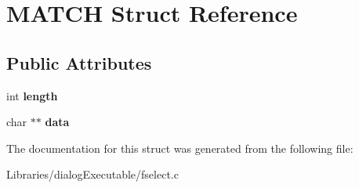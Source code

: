 \hypertarget{struct_m_a_t_c_h}{}\section{M\+A\+T\+CH Struct Reference}
\label{struct_m_a_t_c_h}
\subsection*{Public Attributes}
\begin{DoxyCompactItemize}
\item 
int {\bfseries length}\hypertarget{struct_m_a_t_c_h_a9400c7f8d2108b1d72dcdc80d013bf7e}{}\label{struct_m_a_t_c_h_a9400c7f8d2108b1d72dcdc80d013bf7e}

\item 
char $\ast$$\ast$ {\bfseries data}\hypertarget{struct_m_a_t_c_h_ab8b7c1f216d92e1a1396be006e059d75}{}\label{struct_m_a_t_c_h_ab8b7c1f216d92e1a1396be006e059d75}

\end{DoxyCompactItemize}


The documentation for this struct was generated from the following file\+:\begin{DoxyCompactItemize}
\item 
Libraries/dialog\+Executable/fselect.\+c\end{DoxyCompactItemize}
